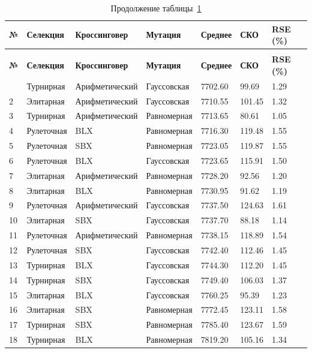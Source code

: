 
\renewcommand{\thetable}{А.\arabic{table}}
\setcounter{table}{0}


\begin{longtable}{|p{}|p{}|p{}|p{}|p{}|p{}|p{}|}
	\caption{Результаты для задачи berlin52.tsp. Оптимальное решение 7542.00}\label{tbl:berlin52.tsp} \\
	\hline
	\textbf{№} & \textbf{Селекция} & \textbf{Кроссинговер} & \textbf{Мутация} & \textbf{Среднее} & \textbf{СКО} & \textbf{RSE (\%)} \\
	\hline
	\endfirsthead
	\caption*{Продолжение таблицы~\ref{tbl:berlin52.tsp}} \\
	\hline
	\textbf{№} & \textbf{Селекция} & \textbf{Кроссинговер} & \textbf{Мутация} & \textbf{Среднее} & \textbf{СКО} & \textbf{RSE (\%)} \\
	\hline
	\endhead
	\hline
	\endfoot
	\endlastfoot
	1 & Турнирная & Арифметический & Гауссовская & 7702.60 & 99.69 & 1.29 \\
	\hline
	2 & Элитарная & Арифметический & Гауссовская & 7710.55 & 101.45 & 1.32 \\
	\hline
	3 & Турнирная & Арифметический & Равномерная & 7713.65 & 80.61 & 1.05 \\
	\hline
	4 & Рулеточная & BLX & Равномерная & 7716.30 & 119.48 & 1.55 \\
	\hline
	5 & Рулеточная & SBX & Равномерная & 7723.05 & 119.87 & 1.55 \\
	\hline
	6 & Рулеточная & BLX & Гауссовская & 7723.65 & 115.91 & 1.50 \\
	\hline
	7 & Элитарная & Арифметический & Равномерная & 7728.20 & 92.56 & 1.20 \\
	\hline
	8 & Элитарная & BLX & Равномерная & 7730.95 & 91.62 & 1.19 \\
	\hline
	9 & Рулеточная & Арифметический & Гауссовская & 7737.50 & 124.63 & 1.61 \\
	\hline
	10 & Элитарная & SBX & Гауссовская & 7737.70 & 88.18 & 1.14 \\
	\hline
	11 & Рулеточная & Арифметический & Равномерная & 7738.15 & 118.89 & 1.54 \\
	\hline
	12 & Рулеточная & SBX & Гауссовская & 7742.40 & 112.46 & 1.45 \\
	\hline
	13 & Турнирная & BLX & Гауссовская & 7744.30 & 112.20 & 1.45 \\
	\hline
	14 & Турнирная & SBX & Гауссовская & 7749.40 & 106.03 & 1.37 \\
	\hline
	15 & Элитарная & BLX & Гауссовская & 7760.25 & 95.39 & 1.23 \\
	\hline
	16 & Элитарная & SBX & Равномерная & 7772.45 & 123.11 & 1.58 \\
	\hline
	17 & Турнирная & SBX & Равномерная & 7785.40 & 123.67 & 1.59 \\
	\hline
	18 & Турнирная & BLX & Равномерная & 7819.20 & 105.16 & 1.34 \\
	\hline
\end{longtable}


